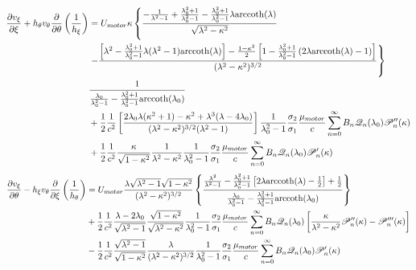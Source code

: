 \documentclass[fontsize=11pt, %
                             paper=a4, %
                             twoside, %
                             captions=tableheading,
                             index=totoc,
                             hyperref]{labbook}
\begin{document}
\begin{equation}
\begin{aligned}
\frac{\partial v_\xi}{\partial \xi}+h_\theta v_\theta \frac{\partial }{\partial \theta}\left(\frac{1}{h_\xi}\right)&=U_{motor}\kappa\left\{\frac{-\frac{1}{\lambda^2-1}+\frac{\lambda_0^2+1}{\lambda_0^2-1}-\frac{\lambda_0^2+1}{\lambda_0^2-1}\lambda\mathrm{arccoth}(\lambda)}{\sqrt{\lambda^2-\kappa^2}}\right.\\
&\left.-\frac{\left[\lambda^2-\frac{\lambda_0^2+1}{\lambda_0^2-1}\lambda(\lambda^2-1)\mathrm{arccoth}(\lambda)\right]-\frac{1-\kappa^2}{2}\left[1-\frac{\lambda_0^2+1}{\lambda_0^2-1}\left(2\lambda\mathrm{arccoth}(\lambda)-1\right)\right]}{(\lambda^2-\kappa^2)^{3/2}} \right\}\\
&\frac{1}{\frac{\lambda_0}{\lambda_0^2-1}-\frac{\lambda_0^2+1}{\lambda_0^2-1}\mathrm{arccoth}(\lambda_0)}\\
&+\frac{1}{2}\frac{1}{c^2}\left[\frac{2\lambda_0\lambda(\kappa^2+1)-\kappa^2+\lambda^3(\lambda-4\lambda_0)}{(\lambda^2-\kappa^2)^{3/2}(\lambda^2-1)}\right]\frac{1}{\lambda_0^2-1}\frac{\sigma_2}{\sigma_1}\frac{\mu_{motor}}{c}\sum_{n=0}^\infty B_n \mathscr{Q}_n(\lambda_0)\mathscr{P}_n^{\prime\prime}(\kappa)\\
&+\frac{1}{2}\frac{1}{c^2}\frac{\kappa}{\sqrt{1-\kappa^2}}\frac{1}{\lambda^2-\kappa^2}\frac{1}{\lambda_0^2-1}\frac{\sigma_2}{\sigma_1}\frac{\mu_{motor}}{c}\sum_{n=0}^\infty B_n \mathscr{Q}_n(\lambda_0)\mathscr{P}_n^\prime(\kappa)
\end{aligned}
\end{equation}
\begin{equation}
\begin{aligned}
\frac{\partial v_\xi}{\partial \theta}-h_\xi v_\theta\frac{\partial }{\partial \xi}\left(\frac{1}{h_\theta}\right)&=U_{motor}\frac{\lambda\sqrt{\lambda^2-1}\sqrt{1-\kappa^2}}{(\lambda^2-\kappa^2)^{3/2}}\left\{ \frac{\frac{\lambda^2}{\lambda^2-1}-\frac{\lambda_0^2+1}{\lambda_0^2-1}\left[2\lambda\mathrm{arccoth}(\lambda)-\frac{1}{2}\right]+\frac{1}{2}}{\frac{\lambda_0}{\lambda_0^2-1}-\frac{\lambda_0^2+1}{\lambda_0^2-1}\mathrm{arccoth}(\lambda_0)} \right\}\\
&+\frac{1}{2}\frac{1}{c^2}\frac{\lambda-2\lambda_0}{\sqrt{\lambda^2-1}}\frac{\sqrt{1-\kappa^2}}{\sqrt{\lambda^2-\kappa^2}}\frac{1}{\lambda_0^2-1}\frac{\sigma_2}{\sigma_1}\frac{\mu_{motor}}{c}\sum_{n=0}^\infty B_n \mathscr{Q}_n(\lambda_0)\left[\frac{\kappa}{\lambda^2-\kappa^2}\mathscr{P}_n^{\prime\prime}(\kappa)-\mathscr{P}_n^{\prime\prime\prime}(\kappa)\right]\\
&-\frac{1}{2}\frac{1}{c^2}\frac{\sqrt{\lambda^2-1}}{\sqrt{1-\kappa^2}}\frac{\lambda}{(\lambda^2-\kappa^2)^{3/2}}\frac{1}{\lambda_0^2-1}\frac{\sigma_2}{\sigma_1}\frac{\mu_{motor}}{c}\sum_{n=0}^\infty B_n\mathscr{Q}_n(\lambda_0)\mathscr{P}_n^\prime(\kappa)
\end{aligned}
\end{equation}
\end{document}
